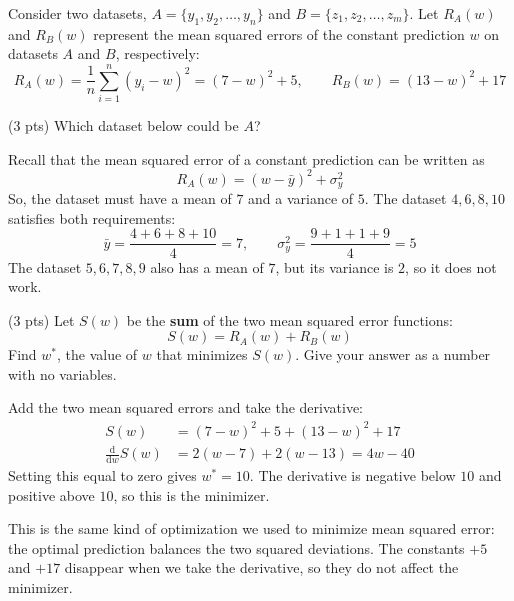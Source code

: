 \documentclass[11pt,twoside]{article}
\begin{document}
\begin{prob}[(12 pts)]\begingroup
Consider two datasets, $A=\{y_1,y_2,\ldots,y_n\}$ and $B=\{z_1,z_2,\ldots,z_m\}$. Let $R_A(w)$ and $R_B(w)$ represent the mean squared errors of the constant prediction $w$ on datasets $A$ and $B$, respectively:
$$
R_A(w)=\frac{1}{n}\sum_{i=1}^n(y_i-w)^2=(7-w)^2+5,\qquad
R_B(w)=(13-w)^2+17
$$

\begin{subprob}(3 pts) Which dataset below could be $A$?
\par\medskip
\noindent{}\hspace{0.6cm}
\hspace{0.6cm}
\hspace{0.6cm}

\begin{solution}
Recall that the mean squared error of a constant prediction can be written as
\[
R_A(w)=(w-\bar y)^2+\sigma_y^2
\]
So, the dataset must have a mean of $7$ and a variance of $5$. The dataset $\boxed{4,6,8,10}$ satisfies both requirements:
\[
\bar y=\frac{4+6+8+10}{4}=7,\qquad
\sigma_y^2=\frac{9+1+1+9}{4}=5
\]
The dataset $5,6,7,8,9$ also has a mean of $7$, but its variance is $2$, so it does not work.
\end{solution}
\end{subprob}

\begin{subprob}(3 pts) Let $S(w)$ be the \textbf{sum} of the two mean squared error functions:
$$
S(w)=R_A(w)+R_B(w)
$$
Find $w^*$, the value of $w$ that minimizes $S(w)$. Give your answer as a number with no variables.
\par\medskip

\begin{solution}
Add the two mean squared errors and take the derivative:
\begin{align*}
S(w)&=(7-w)^2+5+(13-w)^2+17\\
\frac{\mathrm d}{\mathrm dw}S(w)&=2(w-7)+2(w-13)=4w-40
\end{align*}
Setting this equal to zero gives $\boxed{w^*=10}$. The derivative is negative below $10$ and positive above $10$, so this is the minimizer.

This is the same kind of optimization we used to minimize mean squared error: the optimal prediction balances the two squared deviations. The constants $+5$ and $+17$ disappear when we take the derivative, so they do not affect the minimizer.
\end{solution}
\end{subprob}


\end{prob}
\end{document}
